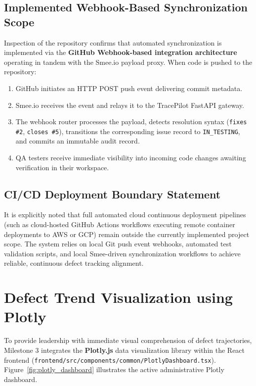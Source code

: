 \documentclass[11pt,a4paper]{article}
\begin{document}
\subsection{Implemented Webhook-Based Synchronization Scope}
Inspection of the repository confirms that automated synchronization is implemented via the \textbf{GitHub Webhook-based integration architecture} operating in tandem with the Smee.io payload proxy. When code is pushed to the repository:
\begin{enumerate}
    \item GitHub initiates an HTTP POST push event delivering commit metadata.
    \item Smee.io receives the event and relays it to the TracePilot FastAPI gateway.
    \item The webhook router processes the payload, detects resolution syntax (\texttt{fixes \#2}, \texttt{closes \#5}), transitions the corresponding issue record to \texttt{IN\_TESTING}, and commits an immutable audit record.
    \item QA testers receive immediate visibility into incoming code changes awaiting verification in their workspace.
\end{enumerate}

\subsection{CI/CD Deployment Boundary Statement}
It is explicitly noted that full automated cloud continuous deployment pipelines (such as cloud-hosted GitHub Actions workflows executing remote container deployments to AWS or GCP) remain outside the currently implemented project scope. The system relies on local Git push event webhooks, automated test validation scripts, and local Smee-driven synchronization workflows to achieve reliable, continuous defect tracking alignment.

\section{Defect Trend Visualization using Plotly}
To provide leadership with immediate visual comprehension of defect trajectories, Milestone 3 integrates the \textbf{Plotly.js} data visualization library within the React frontend (\texttt{frontend/src/components/common/PlotlyDashboard.tsx}). Figure~\ref{fig:plotly_dashboard} illustrates the active administrative Plotly dashboard.
\end{document}
